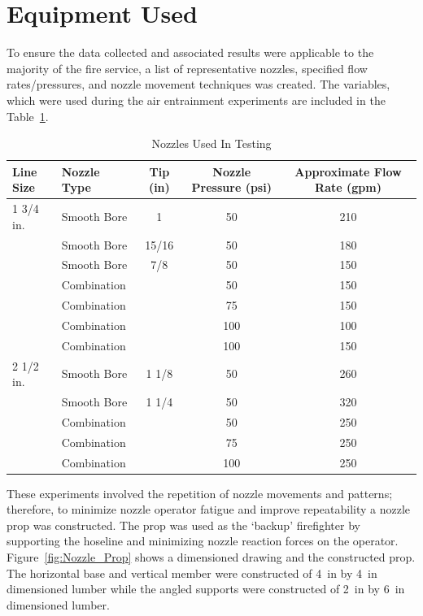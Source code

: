 \documentclass[12pt,oneside]{book}
\begin{document}
\clearpage

\section{Equipment Used}

To ensure the data collected and associated results were applicable to the majority of the fire service, a list of representative nozzles, specified flow rates/pressures, and nozzle movement techniques was created. The variables, which were used during the air entrainment experiments are included in the Table~\ref{tab:Nozzle Selection}.

\begin{table}[!ht]
\centering
\caption{Nozzles Used In Testing}\label{tab:Nozzle Selection}
\begin{tabular}{llccc}
\toprule[1.5pt]
Line Size & Nozzle Type & Tip (in)& Nozzle Pressure (psi) & Approximate Flow Rate (gpm) \\
\midrule
1 3/4 in. & Smooth Bore & 1     & 50  & 210 \\
          & Smooth Bore & 15/16 & 50  & 180 \\
          & Smooth Bore & 7/8   & 50  & 150 \\
          & Combination &       & 50  & 150 \\
          & Combination &       & 75  & 150 \\
          & Combination &       & 100 & 100 \\
          & Combination &       & 100 & 150 \\
\midrule
2 1/2 in. & Smooth Bore & 1 1/8 & 50  & 260 \\
          & Smooth Bore & 1 1/4 & 50  & 320 \\
          & Combination &       & 50  & 250 \\ 
          & Combination &       & 75  & 250 \\
          & Combination &       & 100 & 250 \\
\bottomrule[1.25pt]
\end{tabular}
\end{table}

These experiments involved the repetition of nozzle movements and patterns; therefore, to minimize nozzle operator fatigue and improve repeatability a nozzle prop was constructed. The prop was used as the `backup' firefighter by supporting the hoseline and minimizing nozzle reaction forces on the operator. Figure~\ref{fig:Nozzle_Prop} shows a dimensioned drawing and the constructed prop. The horizontal base and vertical member were constructed of 4~in by 4~in dimensioned lumber while the angled supports were constructed of 2~in by 6~in dimensioned lumber.
\end{document}
